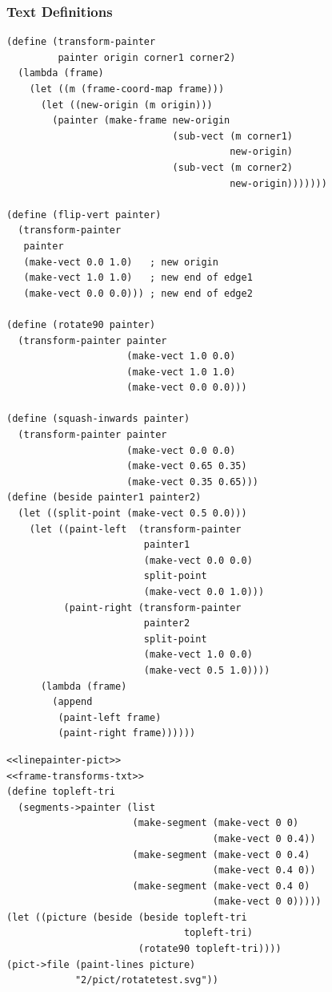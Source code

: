 \documentclass[final,fleqn,titlepage,twoside]{article}
\begin{document}
\subsubsection{Text Definitions}
\label{sec:org0001320}
\begin{verbatim}
(define (transform-painter 
         painter origin corner1 corner2)
  (lambda (frame)
    (let ((m (frame-coord-map frame)))
      (let ((new-origin (m origin)))
        (painter (make-frame new-origin
                             (sub-vect (m corner1) 
                                       new-origin)
                             (sub-vect (m corner2)
                                       new-origin)))))))

(define (flip-vert painter)
  (transform-painter 
   painter
   (make-vect 0.0 1.0)   ; new origin
   (make-vect 1.0 1.0)   ; new end of edge1
   (make-vect 0.0 0.0))) ; new end of edge2

(define (rotate90 painter)
  (transform-painter painter
                     (make-vect 1.0 0.0)
                     (make-vect 1.0 1.0)
                     (make-vect 0.0 0.0)))

(define (squash-inwards painter)
  (transform-painter painter
                     (make-vect 0.0 0.0)
                     (make-vect 0.65 0.35)
                     (make-vect 0.35 0.65)))
(define (beside painter1 painter2)
  (let ((split-point (make-vect 0.5 0.0)))
    (let ((paint-left  (transform-painter 
                        painter1
                        (make-vect 0.0 0.0)
                        split-point
                        (make-vect 0.0 1.0)))
          (paint-right (transform-painter
                        painter2
                        split-point
                        (make-vect 1.0 0.0)
                        (make-vect 0.5 1.0))))
      (lambda (frame)
        (append
         (paint-left frame)
         (paint-right frame))))))
\end{verbatim}
\begin{verbatim}
<<linepainter-pict>>
<<frame-transforms-txt>>
(define topleft-tri
  (segments->painter (list
                      (make-segment (make-vect 0 0)
                                    (make-vect 0 0.4))
                      (make-segment (make-vect 0 0.4)
                                    (make-vect 0.4 0))
                      (make-segment (make-vect 0.4 0)
                                    (make-vect 0 0)))))
(let ((picture (beside (beside topleft-tri
                               topleft-tri)
                       (rotate90 topleft-tri))))
(pict->file (paint-lines picture)
            "2/pict/rotatetest.svg"))
\end{verbatim}
\end{document}
